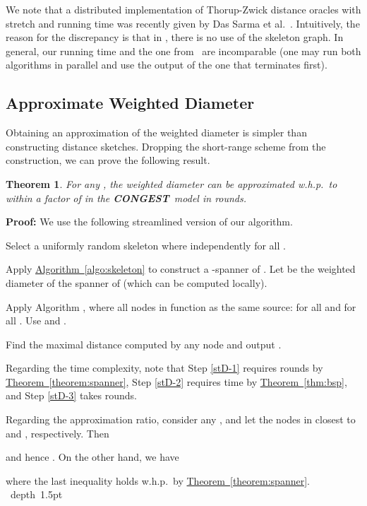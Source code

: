\documentclass[letterpaper,11pt]{article}
\newcommand{\namedref}[2]{\hyperref[#2]{#1~\ref*{#2}}}
\newcommand{\theoremref}[1]{\namedref{Theorem}{#1}}
\newcommand{\algref}[1]{\namedref{Algorithm}{#1}}
\newtheorem{theorem}{Theorem}[section]
\newcommand{\blackslug}{\hbox{\hskip 1pt \vrule width 4pt height 8pt
depth 1.5pt \hskip 1pt}}
\newcommand{\QED}{\quad\blackslug\lower 8.5pt\null\par}
\newenvironment{proof}[1][Proof:]{\noindent \textbf{#1}\xspace}{\QED}
\newcommand{\CONGEST}{\textbf{CONGEST}}
\begin{document}
We note that a distributed implementation of Thorup-Zwick distance
oracles with stretch  and  running time  was recently given by Das Sarma et al.~\cite{DDP}.
Intuitively, the reason for the discrepancy is that in \cite{DDP},
there is no use of the skeleton graph. In general, our running time and
the one from~\cite{DDP} are incomparable (one may run both algorithms in
parallel and use the output of the one that terminates first).

\subsection{Approximate Weighted Diameter}

Obtaining an approximation of the weighted diameter is simpler than constructing
distance sketches. Dropping the short-range scheme from the construction, we can
prove the following result.
\begin{theorem}\label{thm-diameter}
For any , the weighted diameter  can be approximated w.h.p.\ to
within a factor of  in the \CONGEST\ model in
 rounds.
\end{theorem}
\begin{proof}
We use the following streamlined version of our algorithm. 
\begin{compactenum}
\item Select a uniformly random skeleton  where
   independently for all .
\item \label{stD-1} Apply \algref{algo:skeleton} to construct a
  -spanner of . Let  be the weighted
  diameter of the spanner of  (which can be computed
  locally).
\item \label{stD-2} Apply Algorithm , where
  all nodes in  function as the same source:  for all
   and  for all .
Use  and  .
\item \label{stD-3} Find the maximal distance  computed by
  any node and output .
\end{compactenum}
Regarding the time complexity, note that Step \ref{stD-1} requires
 rounds by
\theoremref{theorem:spanner},
Step \ref{stD-2} requires  time by
\theoremref{thm:bsp}, and Step \ref{stD-3} takes  rounds. 

Regarding  the approximation ratio,  consider any , and let
 the nodes in  closest to  and ,
respectively. Then

and hence . 
On the other hand, we have 

where the last inequality holds w.h.p.\ by
\theoremref{theorem:spanner}. 
\end{proof}
\end{document}
